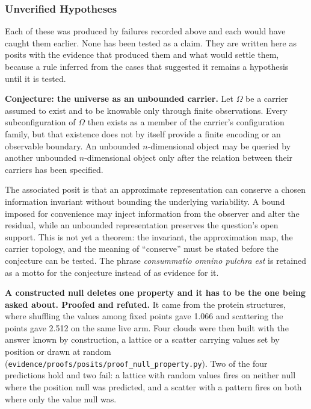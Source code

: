 \subsubsection{Unverified Hypotheses}

Each of these was produced by failures recorded above and each would have caught them earlier. None has been tested as a claim. They are written here as posits with the evidence that produced them and what would settle them, because a rule inferred from the cases that suggested it remains a hypothesis until it is tested.

\textbf{Conjecture: the universe as an unbounded carrier.} Let \(\Omega\) be a carrier assumed to exist and to be knowable only through finite observations. Every subconfiguration of \(\Omega\) then exists as a member of the carrier's configuration family, but that existence does not by itself provide a finite encoding or an observable boundary. An unbounded \(n\)-dimensional object may be queried by another unbounded \(n\)-dimensional object only after the relation between their carriers has been specified.

The associated posit is that an approximate representation can conserve a chosen information invariant without bounding the underlying variability. A bound imposed for convenience may inject information from the observer and alter the residual, while an unbounded representation preserves the question's open support. This is not yet a theorem: the invariant, the approximation map, the carrier topology, and the meaning of ``conserve'' must be stated before the conjecture can be tested. The phrase \emph{consummatio omnino pulchra est} is retained as a motto for the conjecture instead of as evidence for it.

\textbf{A constructed null deletes one property and it has to be the one being asked about. Proofed and refuted.} It came from the protein structures, where shuffling the values among fixed points gave 1.066 and scattering the points gave 2.512 on the same live arm. Four clouds were then built with the answer known by construction, a lattice or a scatter carrying values set by position or drawn at random (\texttt{evidence/\allowbreak{}proofs/\allowbreak{}posits/\allowbreak{}proof\_\allowbreak{}null\_\allowbreak{}property.\allowbreak{}py}). Two of the four predictions hold and two fail: a lattice with random values fires on neither null where the position null was predicted, and a scatter with a pattern fires on both where only the value null was.

